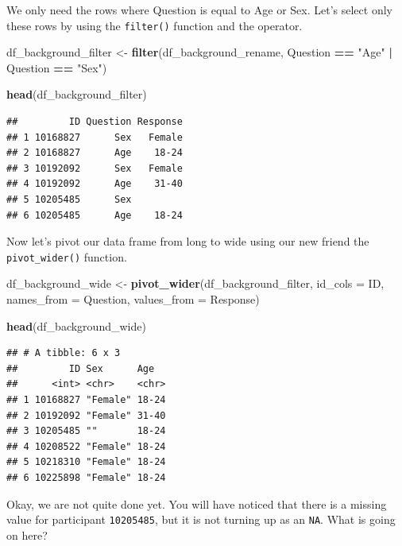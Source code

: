 \documentclass[
]{book}
\newenvironment{Shaded}{\begin{snugshade}}{\end{snugshade}}
\newcommand{\AttributeTok}[1]{\textcolor[rgb]{0.13,0.29,0.53}{#1}}
\newcommand{\FunctionTok}[1]{\textcolor[rgb]{0.13,0.29,0.53}{\textbf{#1}}}
\newcommand{\NormalTok}[1]{#1}
\newcommand{\OtherTok}[1]{\textcolor[rgb]{0.56,0.35,0.01}{#1}}
\newcommand{\SpecialCharTok}[1]{\textcolor[rgb]{0.81,0.36,0.00}{\textbf{#1}}}
\newcommand{\StringTok}[1]{\textcolor[rgb]{0.31,0.60,0.02}{#1}}
\begin{document}
We only need the rows where Question is equal to Age or Sex. Let's select only these rows by using the \texttt{filter()} function and the \texttt{\textbar{}} operator.

\begin{Shaded}
\begin{Highlighting}[]
\NormalTok{df\_background\_filter }\OtherTok{\textless{}{-}} \FunctionTok{filter}\NormalTok{(df\_background\_rename, Question }\SpecialCharTok{==} \StringTok{"Age"} \SpecialCharTok{|}\NormalTok{ Question }\SpecialCharTok{==} \StringTok{"Sex"}\NormalTok{)}

\FunctionTok{head}\NormalTok{(df\_background\_filter)}
\end{Highlighting}
\end{Shaded}

\begin{verbatim}
##         ID Question Response
## 1 10168827      Sex   Female
## 2 10168827      Age    18-24
## 3 10192092      Sex   Female
## 4 10192092      Age    31-40
## 5 10205485      Sex         
## 6 10205485      Age    18-24
\end{verbatim}

Now let's pivot our data frame from long to wide using our new friend the \texttt{pivot\_wider()} function.

\begin{Shaded}
\begin{Highlighting}[]
\NormalTok{df\_background\_wide }\OtherTok{\textless{}{-}} \FunctionTok{pivot\_wider}\NormalTok{(df\_background\_filter,}
                                   \AttributeTok{id\_cols =}\NormalTok{ ID,}
                                   \AttributeTok{names\_from =}\NormalTok{ Question,}
                                   \AttributeTok{values\_from =}\NormalTok{ Response)}

\FunctionTok{head}\NormalTok{(df\_background\_wide)}
\end{Highlighting}
\end{Shaded}

\begin{verbatim}
## # A tibble: 6 x 3
##         ID Sex      Age  
##      <int> <chr>    <chr>
## 1 10168827 "Female" 18-24
## 2 10192092 "Female" 31-40
## 3 10205485 ""       18-24
## 4 10208522 "Female" 18-24
## 5 10218310 "Female" 18-24
## 6 10225898 "Female" 18-24
\end{verbatim}

Okay, we are not quite done yet. You will have noticed that there is a missing value for participant \texttt{10205485}, but it is not turning up as an \texttt{NA}. What is going on here?
\end{document}
